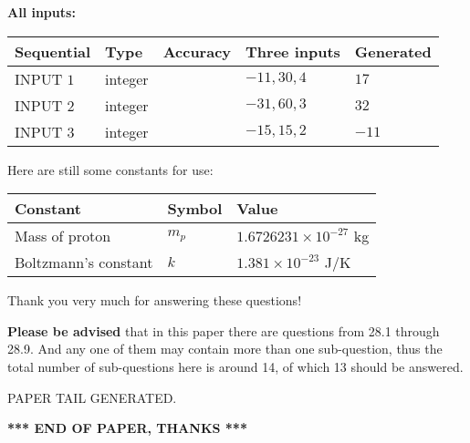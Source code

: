 \documentclass[12pt]{article}
\begin{document}
   
   
   
\noindent\vspace{0.1in}\hspace{-0.08in} {\textbf{\Large{All inputs: }}}
   
   
  
  
\noindent\begin{tabular}{|l|l|l|l|l|}
\hline
 Sequential & Type & Accuracy & Three inputs & Generated \\ 
\hline
 
 
  INPUT $            1 $ & integer &  & $
 -11
 , 
 30
 , 
 4
 $ & $ 17 $ 
 \\  \hline  
 
 
  INPUT $            2 $ & integer &  & $
 -31
 , 
 60
 , 
 3
 $ & $ 32 $ 
 \\  \hline  
 
 
  INPUT $            3 $ & integer &  & $
 -15
 , 
 15
 , 
 2
 $ & $ -11 $ 
 \\  \hline  
 \end{tabular}
   
   
   
   
   
   
 \vspace{0.2in}
Here are still some constants for use:
 
 
\noindent\begin{tabular}{|l|l|l|}
\hline
Constant & Symbol & Value \\
\hline
 
Mass of proton &
$m_p$ &
 $ 1.6726231 \times 10^{-27} $
kg \\
\hline
 
Boltzmann's constant &
$k$ &
 $ 1.381 \times 10^{-23} $
J/K \\
\hline
 
\end{tabular}
 
Thank you very much for answering these questions!
 
{\textbf{\large{Please be advised}}} that in this paper there are questions from
28.1 through
28.9.
And any one of them may contain more than one sub-question, thus the total number
of sub-questions here is around 14, of which
13 should be answered.
 
   
   
\vspace{2.0in} PAPER TAIL GENERATED.
   
   
   
   
\vspace{1.0in} 
{\textbf{\large{ *** END OF PAPER, THANKS *** }}} 
   
\end{document}

